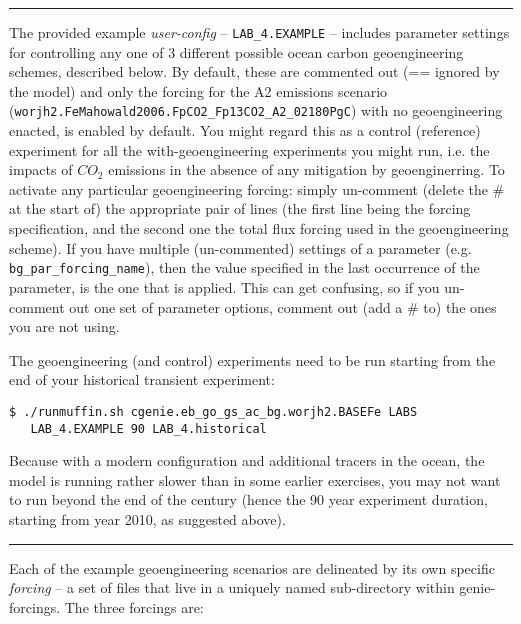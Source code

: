 \vspace{1mm}
\noindent\rule{4cm}{0.1mm}
\vspace{2mm}

\noindent The provided example \textit{user-config} -- \texttt{LAB\_4.EXAMPLE} -- includes parameter settings for controlling any one of 3 different possible ocean carbon geoengineering schemes, described below. By default, these are commented out (== ignored by the model) and only the forcing for the A2 emissions scenario (\texttt{worjh2.FeMahowald2006.FpCO2\_Fp13CO2\_A2\_02180PgC}) with no geoengineering enacted,  is enabled by default. You might regard this as a control (reference) experiment for all the with-geoengineering experiments you might run, i.e. the impacts of \(CO_{2}\) emissions in the absence of any mitigation by geoenginerring. To activate any particular geoengineering forcing: simply un-comment (delete the \# at the start of) the appropriate pair of lines (the first line being the forcing specification, and the second one the total flux forcing used in the geoengineering scheme). If you have multiple (un-commented) settings of a parameter (e.g. \texttt{bg\_par\_forcing\_name}), then the value specified in the last occurrence of the parameter, is the one that is applied. This can get confusing, so if you un-comment out one set of parameter options, comment out (add a \# to) the ones you are not using.

The geoengineering (and control) experiments need to be run starting from the end of your historical transient experiment:
\vspace{-2pt}\begin{verbatim}
$ ./runmuffin.sh cgenie.eb_go_gs_ac_bg.worjh2.BASEFe LABS
   LAB_4.EXAMPLE 90 LAB_4.historical
\end{verbatim}\vspace{-2pt}
Because with a modern configuration and additional tracers in the ocean, the model is running rather slower than in some earlier exercises, you may not want to run beyond the end of the century (hence the 90 year experiment duration, starting from year 2010, as suggested above).

\vspace{1mm}
\noindent\rule{4cm}{0.1mm}
\vspace{2mm}

\noindent Each of the example geoengineering scenarios are delineated by its own specific \textit{forcing} – a set of files that live in a uniquely named sub-directory within \textsf{\footnotesize genie-forcings}. The three forcings are:

